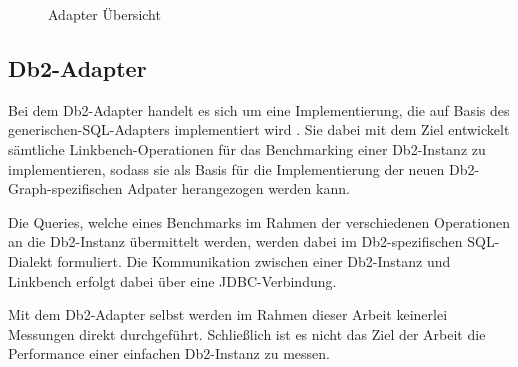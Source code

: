 \begin{figure}[!ht]
    \centering
	\usetikzlibrary{arrows, arrows.meta}
    \caption{Adapter Übersicht}
    \label{fig:adapter_uebersicht}
\end{figure}


\subsection{Db2-Adapter}
\label{implementierung:adapter:db2}
Bei dem Db2-Adapter handelt es sich um eine Implementierung, die auf Basis des generischen-SQL-Adapters implementiert wird \cite{mc_linkbench_github}. Sie dabei mit dem Ziel entwickelt sämtliche Linkbench-Operationen für das Benchmarking einer Db2-Instanz zu implementieren, sodass sie als Basis für die Implementierung der neuen Db2-Graph-spezifischen Adpater herangezogen werden kann.

Die Queries, welche eines Benchmarks im Rahmen der verschiedenen Operationen an die Db2-Instanz übermittelt werden, werden dabei im Db2-spezifischen SQL-Dialekt formuliert. Die Kommunikation zwischen einer Db2-Instanz und Linkbench erfolgt dabei über eine JDBC-Verbindung. 

Mit dem Db2-Adapter selbst werden im Rahmen dieser Arbeit keinerlei Messungen direkt durchgeführt. Schließlich ist es nicht das Ziel der Arbeit die Performance einer einfachen Db2-Instanz zu messen. 

